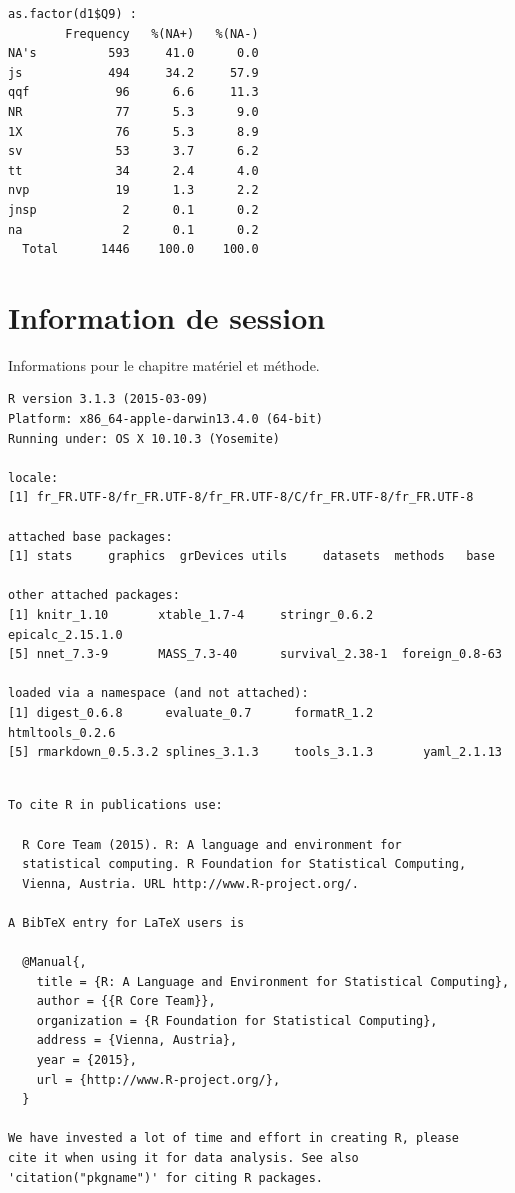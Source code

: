\documentclass[]{article}
\begin{document}
\begin{verbatim}
as.factor(d1$Q9) : 
        Frequency   %(NA+)   %(NA-)
NA's          593     41.0      0.0
js            494     34.2     57.9
qqf            96      6.6     11.3
NR             77      5.3      9.0
1X             76      5.3      8.9
sv             53      3.7      6.2
tt             34      2.4      4.0
nvp            19      1.3      2.2
jnsp            2      0.1      0.2
na              2      0.1      0.2
  Total      1446    100.0    100.0
\end{verbatim}

\section{Information de session}\label{information-de-session}

Informations pour le chapitre matériel et méthode.

\begin{verbatim}
R version 3.1.3 (2015-03-09)
Platform: x86_64-apple-darwin13.4.0 (64-bit)
Running under: OS X 10.10.3 (Yosemite)

locale:
[1] fr_FR.UTF-8/fr_FR.UTF-8/fr_FR.UTF-8/C/fr_FR.UTF-8/fr_FR.UTF-8

attached base packages:
[1] stats     graphics  grDevices utils     datasets  methods   base     

other attached packages:
[1] knitr_1.10       xtable_1.7-4     stringr_0.6.2    epicalc_2.15.1.0
[5] nnet_7.3-9       MASS_7.3-40      survival_2.38-1  foreign_0.8-63  

loaded via a namespace (and not attached):
[1] digest_0.6.8      evaluate_0.7      formatR_1.2       htmltools_0.2.6  
[5] rmarkdown_0.5.3.2 splines_3.1.3     tools_3.1.3       yaml_2.1.13      
\end{verbatim}

\begin{verbatim}

To cite R in publications use:

  R Core Team (2015). R: A language and environment for
  statistical computing. R Foundation for Statistical Computing,
  Vienna, Austria. URL http://www.R-project.org/.

A BibTeX entry for LaTeX users is

  @Manual{,
    title = {R: A Language and Environment for Statistical Computing},
    author = {{R Core Team}},
    organization = {R Foundation for Statistical Computing},
    address = {Vienna, Austria},
    year = {2015},
    url = {http://www.R-project.org/},
  }

We have invested a lot of time and effort in creating R, please
cite it when using it for data analysis. See also
'citation("pkgname")' for citing R packages.
\end{verbatim}
\end{document}
